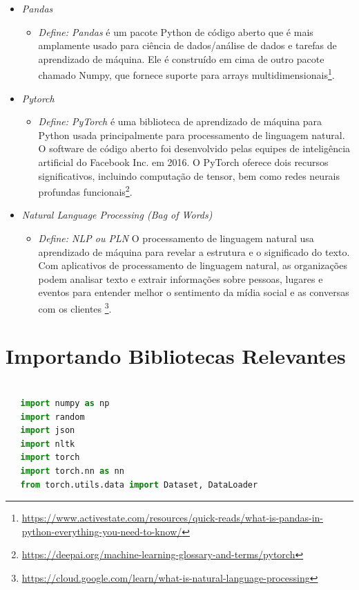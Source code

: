 \begin{itemize}
   \item \textit{Pandas}
         \begin{itemize}
            \item \textit{Define: Pandas} é um pacote Python de código aberto que é mais amplamente usado para ciência de dados/análise de dados e tarefas de aprendizado de máquina. Ele é construído em cima de outro pacote chamado Numpy, que fornece suporte para arrays multidimensionais\footnote{\url{https://www.activestate.com/resources/quick-reads/what-is-pandas-in-python-everything-you-need-to-know/}}.
         \end{itemize}

   \item \textit{Pytorch}
         \begin{itemize}
            \item \textit{Define: PyTorch} é uma biblioteca de aprendizado de máquina para Python usada principalmente para processamento de linguagem natural. O software de código aberto foi desenvolvido pelas equipes de inteligência artificial do Facebook Inc. em 2016. O PyTorch oferece dois recursos significativos, incluindo computação de tensor, bem como redes neurais profundas funcionais\footnote{\url{https://deepai.org/machine-learning-glossary-and-terms/pytorch}}.
         \end{itemize}

   \item \textit{Natural Language Processing (Bag of Words)}
         \begin{itemize}
            \item \textit{Define: NLP ou PLN }O processamento de linguagem natural usa aprendizado de máquina para revelar a estrutura e o significado do texto. Com aplicativos de processamento de linguagem natural, as organizações podem analisar texto e extrair informações sobre pessoas, lugares e eventos para entender melhor o sentimento da mídia social e as conversas com os clientes \footnote{\url{https://cloud.google.com/learn/what-is-natural-language-processing}}.
         \end{itemize}


\end{itemize}

\section[Importando Bibliotecas Relevantes]{Importando Bibliotecas Relevantes}
\begin{lstlisting}[language=Python, caption=Python Bibliotecas]

   import numpy as np
   import random
   import json
   import nltk
   import torch
   import torch.nn as nn
   from torch.utils.data import Dataset, DataLoader
\end{lstlisting}


